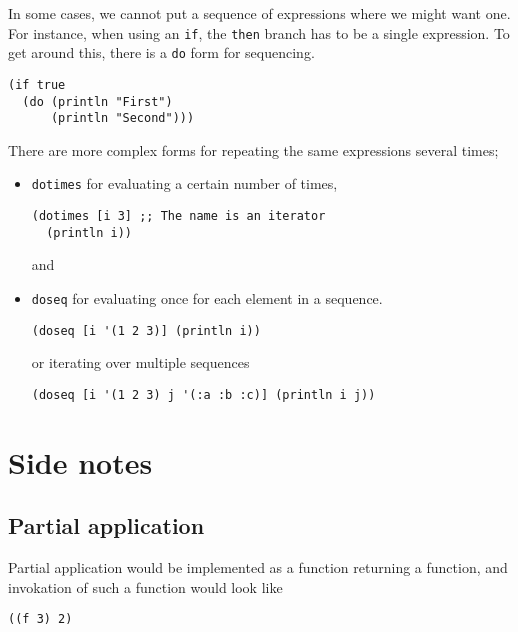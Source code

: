 \documentclass[11pt]{article}
\begin{document}
In some cases, we cannot put a sequence of expressions
where we might want one. For instance, when using an \texttt{if},
the \texttt{then} branch has to be a single expression.
To get around this, there is a \texttt{do} form for sequencing.
\begin{verbatim}
(if true
  (do (println "First")
      (println "Second")))
\end{verbatim}

There are more complex forms for repeating the same expressions
several times;
\begin{itemize}
\item \texttt{dotimes} for evaluating a certain number of times,
\begin{verbatim}
(dotimes [i 3] ;; The name is an iterator
  (println i))
\end{verbatim}
and

\item \texttt{doseq} for evaluating once for each element in a sequence.
\begin{verbatim}
(doseq [i '(1 2 3)] (println i))
\end{verbatim}
or iterating over multiple sequences
\begin{verbatim}
(doseq [i '(1 2 3) j '(:a :b :c)] (println i j))
\end{verbatim}
\end{itemize}

\section{Side notes}
\label{sec:org615f985}
\subsection{Partial application}
\label{sec:org1b1fc37}
Partial application would be implemented as
a function returning a function,
and invokation of such a function would look like
\begin{verbatim}
((f 3) 2)
\end{verbatim}
\end{document}
